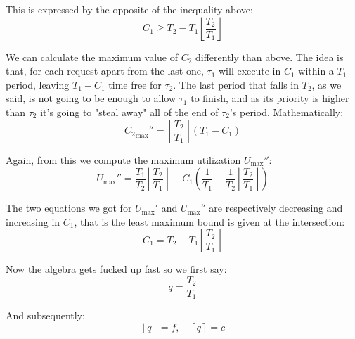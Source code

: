 \documentclass[a4paper,11pt]{article}
\begin{document}
\begin{enumerate}
\begin{center}
	      \end{center}

	      This is expressed by the opposite of the inequality above:
	      $$
		      C_1 \geq T_2 - T_1 \left\lfloor \frac{T_2}{T_1} \right\rfloor
	      $$

	      We can calculate the maximum value of $C_2$ differently than above.
	      The idea is that, for each request apart from the last one, $\tau_1$ will execute in $C_1$ within a $T_1$ period, leaving $T_1 - C_1$ time free for $\tau_2$.
	      The last period that falls in $T_2$, as we said, is not going to be enough to allow $\tau_1$ to finish, and as its priority is higher than $\tau_2$ it's going to "steal away" all of the end of $\tau_2$'s period.
	      Mathematically:
	      $$
		      {C_2}_\text{max}'' = \left\lfloor \frac{T_2}{T_1} \right\rfloor \left( T_1 - C_1 \right)
	      $$

	      Again, from this we compute the maximum utilization $U_\text{max}''$:
	      $$
		      U_\text{max}'' = \frac{T_1}{T_2}\left\lfloor \frac{T_2}{T_1} \right\rfloor + C_1 \left( \frac{1}{T_1} - \frac{1}{T_2} \left\lfloor \frac{T_2}{T_1} \right\rfloor \right)
	      $$

\end{enumerate}

The two equations we got for $U_\text{max}'$ and $U_\text{max}''$ are respectively decreasing and increasing in $C_1$, that is the least maximum bound is given at the intersection:
$$
	C_1 = T_2 - T_1 \left\lfloor \frac{T_2}{T_1} \right\rfloor
$$

Now the algebra gets fucked up fast so we first say:
$$
	q = \frac{T_2}{T_1}
$$

And subsequently:
$$
	\left\lfloor q \right\rfloor = f, \quad
	\left\lceil q \right\rceil = c
$$
\end{document}
